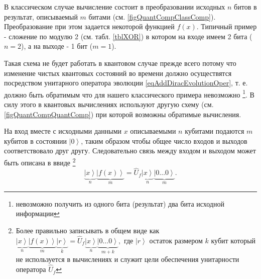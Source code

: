

В классическом случае вычисление состоит в преобразовании исходных $n$
битов в результат, описываемый $m$ битами
(см. \autoref{figQuantCompClassComp}). Преобразование при этом
задается некоторой функцией $f\left(x\right)$. Типичный пример -
сложение по модулю 2 (см. табл. \ref {tblXOR}) в котором на входе имеем 2 бита
($n = 2$), а на выходе - 1 бит ($m = 1$).



Такая схема не будет работать в квантовом случае прежде всего потому
что изменение чистых квантовых состояний во времени должно
осуществятся посредством унитарного оператора эволюции
\eqref{eqAddDiracEvolutionOper}, т. е. должно быть обратимым что для
нашего классического примера невозможно \footnote{невозможно получить
  из одного бита (результат) два бита исходной информации}. В силу
этого в квантовых вычислениях  используют другую схему
(см. \autoref{figQuantCompQuantComp}) при которой возможны обратимые
вычисления.  

На вход вместе с исходными данными $x$ описываемыми $n$ кубитами
подаются $m$ кубитов в состоянии $\left|0\right>$, таким
образом чтобы общее число входов и выходов соответствовало друг
другу. Следовательно связь между входом и выходом может быть описана в
ввиде
\footnote{Более правильно записывать в общем виде как 
$
\underbrace{\left|x\right>}_n
\underbrace{\left|f\left(x\right)\right>}_m
\underbrace{\left|r\right>}_k = 
\hat{U}_f \underbrace{\left|x\right>}_n
\underbrace{\left|0 \dots 0\right>}_{m+k},
$
где $\left|r\right>$ остаток размером $k$ кубит который не
используется в вычислениях и служит цели обеспечения унитарности
оператора $\hat{U}_f$
}
\begin{equation}
\underbrace{\left|x\right>}_n
\underbrace{\left|f\left(x\right)\right>}_m = 
\hat{U}_f \underbrace{\left|x\right>}_n\underbrace{\left|0 \dots
  0\right>}_m.
\label{eqQuantCompQuantComp}
\end{equation}

